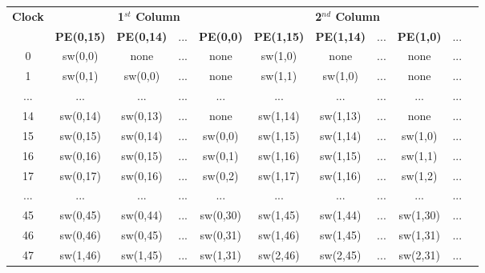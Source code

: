 \begin{table}[htbp]
	\centering
	\label{tab:dataflow1}
	\begin{tabular}{|c|c|c|c|c|c|c|c|c|c|c|}
		\hline
		
		\textbf{Clock} &  \multicolumn{4}{c|}{\textbf{1$^{st}$ Column}} &  \multicolumn{4}{c|}{\textbf{2$^{nd}$ Column}} & \\
		
		\cline{2-9}
		
		& \textbf{PE(0,15)} & \textbf{PE(0,14)} & ... & \textbf{PE(0,0)} & \textbf{PE(1,15)} & \textbf{PE(1,14)} & ... & \textbf{PE(1,0)} & ... \\
		
		\hline
		0 & sw(0,0) & none & ... & none & sw(1,0) & none & ... & none & ... \\
		
		1 & sw(0,1) & sw(0,0) & ... & none & sw(1,1) & sw(1,0) & ... & none & ... \\
		
		... & ... & ... & ... & ... & ... & ... & ... & ... & ... \\
		
		14 & sw(0,14) & sw(0,13) & ... & none & sw(1,14) & sw(1,13) & ... & none & ... \\
		
		15 & sw(0,15) & sw(0,14) & ... & sw(0,0) & sw(1,15) & sw(1,14) & ... & sw(1,0) & ... \\
		
		\hline
		
		16 & sw(0,16) & sw(0,15) & ... & sw(0,1) & sw(1,16) & sw(1,15) & ... & sw(1,1) & ... \\
		
		17 & sw(0,17) & sw(0,16) & ... & sw(0,2) & sw(1,17) & sw(1,16) & ... & sw(1,2) & ... \\
		
		... & ... & ... & ... & ... & ... & ... & ... & ... & ... \\
		
		45 & sw(0,45) & sw(0,44) & ... & sw(0,30) & sw(1,45) & sw(1,44) & ... & sw(1,30) & ... \\
		
		46 & sw(0,46) & sw(0,45) & ... & sw(0,31) & sw(1,46) & sw(1,45) & ... & sw(1,31) & ... \\
		
		\hline
		
		47 & sw(1,46) & sw(1,45) & ... & sw(1,31) & sw(2,46) & sw(2,45) & ... & sw(2,31) & ... \\
		

\end{tabular}
\end{table}
